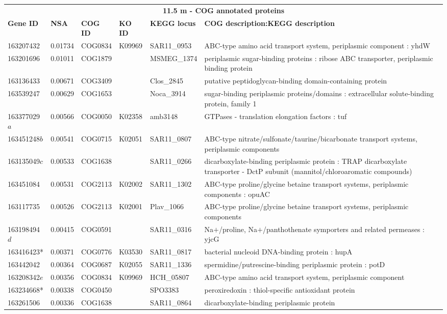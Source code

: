 \begin{landscape}
\begin{longtable}{p{1.6cm}p{1.2cm}p{1.5cm}p{1.5cm}p{2.8cm}p{13.5cm}}
\multicolumn{6}{c}{\textbf{11.5 m - COG annotated proteins}} \\
\textbf{Gene ID} & \textbf{NSA} & \textbf{COG ID} & \textbf{KO ID} & \textbf{KEGG locus} & \textbf{COG description:KEGG description} \\
163207432&0.01734&COG0834&K09969&SAR11\_0953&ABC-type amino acid transport system, periplasmic component : yhdW \\
163201696&0.01011&COG1879&&MSMEG\_1374&periplasmic sugar-binding proteins : ribose ABC transporter, periplasmic binding protein \\
163136433&0.00671&COG3409&&Clos\_2845&putative peptidoglycan-binding domain-containing protein \\
163539247&0.00629&COG1653&&Noca\_3914&sugar-binding periplasmic proteins/domains : extracellular solute-binding protein, family 1 \\
163377029$a$&0.00566&COG0050&K02358&amb3148&GTPases - translation elongation factors : tuf \\
163451248$b$&0.00541&COG0715&K02051&SAR11\_0807&ABC-type nitrate/sulfonate/taurine/bicarbonate transport systems, periplasmic components \\
163135049$c$&0.00533&COG1638&&SAR11\_0266&dicarboxylate-binding periplasmic protein : TRAP dicarboxylate transporter - DctP subunit (mannitol/chloroaromatic compounds) \\
163451084&0.00531&COG2113&K02002&SAR11\_1302&ABC-type proline/glycine betaine transport systems, periplasmic components : opuAC \\
163117735&0.00526&COG2113&K02001&Plav\_1066&ABC-type proline/glycine betaine transport systems, periplasmic components \\
163198494$d$&0.00415&COG0591&&SAR11\_0316&Na$+$/proline, Na$+$/panthothenate symporters and related permeases : yjcG \\
163416423*&0.00371&COG0776&K03530&SAR11\_0817&bacterial nucleoid DNA-binding protein : hupA \\
163442042&0.00364&COG0687&K02055&SAR11\_1336&spermidine/putrescine-binding periplasmic protein : potD \\
163208342$e$&0.00356&COG0834&K09969&HCH\_05807&ABC-type amino acid transport system, periplasmic component \\
163234668*&0.00338&COG0450&&SPO3383&peroxiredoxin : thiol-specific antioxidant protein \\
163261506&0.00336&COG1638&&SAR11\_0864&dicarboxylate-binding periplasmic protein \\

\end{longtable}
\end{landscape}
